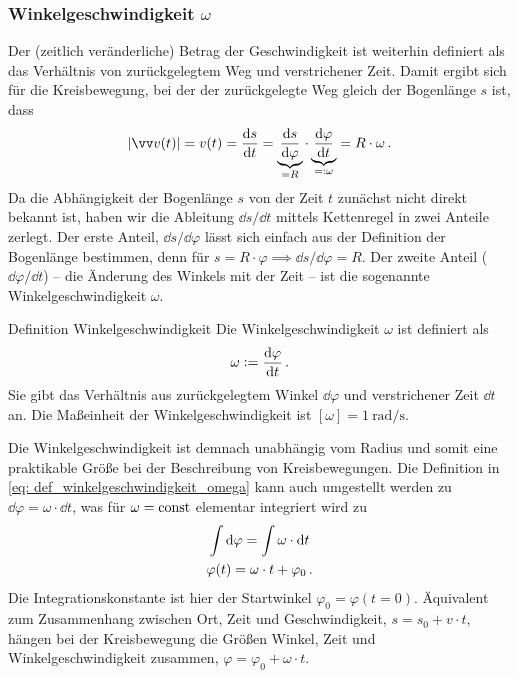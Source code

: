 \subsubsection{Winkelgeschwindigkeit $\omega$}
Der (zeitlich veränderliche) Betrag der Geschwindigkeit ist weiterhin definiert als das Verhältnis von zurückgelegtem Weg und verstrichener Zeit. Damit ergibt sich für die Kreisbewegung, bei der der zurückgelegte Weg gleich der Bogenlänge $s$ ist, dass 
\begin{equation}\label{eq: betrag_geschwindigkeit_kreisbewegung}
    |\ivec{v}(t)| = v(t) = \frac{\dd s}{\dd t} = \underbrace{\frac{\dd s}{\dd \varphi}}_{= R} \cdot \underbrace{\frac{\dd \varphi}{\dd t}}_{\eqdef \omega} = R\cdot \omega \mDot
\end{equation}
Da die Abhängigkeit der Bogenlänge $s$ von der Zeit $t$ zunächst nicht direkt bekannt ist, haben wir die Ableitung $\dd s/\dd t$ mittels Kettenregel in zwei Anteile zerlegt. Der erste Anteil, $\dd s/\dd \varphi$ lässt sich einfach aus der Definition der Bogenlänge bestimmen, denn für $s = R\cdot \varphi \implies \dd s/\dd \varphi = R$. Der zweite Anteil ($\dd \varphi/\dd t$) -- die Änderung des Winkels mit der Zeit -- ist die sogenannte Winkelgeschwindigkeit $\omega$. 
\begin{importantbox}[]{Definition Winkelgeschwindigkeit}
Die Winkelgeschwindigkeit $\omega$ ist definiert als 
\begin{equation}\label{eq: def_winkelgeschwindigkeit_omega}
    \omega \vcentcolon= \frac{\mathrm{d} \varphi}{\mathrm{d} t}\,.
\end{equation}
Sie gibt das Verhältnis aus zurückgelegtem Winkel $\dd \varphi$ und verstrichener Zeit $\dd t$ an. Die Maßeinheit der Winkelgeschwindigkeit ist $[\omega] = \SI{1}{\radian\per\second}$. 
\end{importantbox}
Die Winkelgeschwindigkeit ist demnach unabhängig vom Radius und somit eine praktikable Größe bei der Beschreibung von Kreisbewegungen. Die Definition in \cref{eq: def_winkelgeschwindigkeit_omega} kann auch umgestellt werden zu $\dd \varphi = \omega \cdot \dd t $, was für $\omega = \mathrm{const}$ elementar integriert wird zu 
\begin{equation}\begin{gathered}
    \int \mathrm{d} \varphi = \int \omega\cdot  \mathrm{d} t \\
    \varphi(t) = \omega \cdot t + \varphi_0 \,.
\end{gathered}\end{equation}
Die Integrationskonstante ist hier der Startwinkel $\varphi_0 = \varphi(t=0)$. Äquivalent zum Zusammenhang zwischen Ort, Zeit und Geschwindigkeit, $s = s_0 +  v\cdot t$, hängen bei der Kreisbewegung die Größen Winkel, Zeit und Winkelgeschwindigkeit zusammen, $\varphi = \varphi_0 + \omega \cdot t$. 


